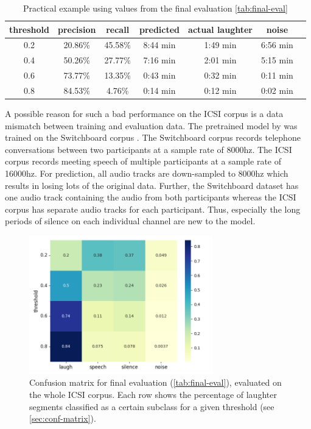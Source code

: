 \documentclass[bsc,frontabs,parskip,deptreport]{infthesis}
\newcommand{\confmatrixcaption}{Each row shows the percentage of laughter segments classified as a certain subclass for a given threshold (see \autoref{sec:conf-matrix}). }
\begin{document}
\begin{table}[]
    \centering
    \begin{tabular}{|c|c|c|c|c|c|c|}
      \hline
      threshold & precision & recall & predicted & actual laughter & noise \\
      \hline
      0.2 &  20.86\% & 45.58\% & 8:44 min & 1:49 min & 6:56 min \\
      0.4 &  50.26\% & 27.77\% & 7:16 min & 2:01 min & 5:15 min \\
      0.6 &  73.77\% & 13.35\% & 0:43 min & 0:32 min & 0:11 min \\
      0.8 &  84.53\% & 4.76\% & 0:14 min & 0:12 min & 0:02 min \\
      \hline
    \end{tabular}
    \caption{Practical example using values from the final evaluation \autoref{tab:final-eval}}
    \label{tab:practical-example}
\end{table}


A possible reason for such a bad performance on the ICSI corpus is a data mismatch between training and evaluation data. The pretrained model by \citet{gillick2021robust} was trained on the Switchboard corpus \citep{switchboard-corpus}. The Switchboard corpus records telephone conversations between two participants at a sample rate of 8000hz. The ICSI corpus records meeting speech of multiple participants at a sample rate of 16000hz. For prediction, all audio tracks are down-sampled to 8000hz which results in losing lots of the original data. 
Further, the Switchboard dataset has one audio track containing the audio from both participants whereas the ICSI corpus has separate audio tracks for each participant. Thus, especially the long periods of silence on each individual channel are new to the model. 

\begin{figure}[h!]
    \centering
    \includegraphics[width=8cm]{imgs/conf_matrix/init_eval_all.png}
    \caption{Confusion matrix for final evaluation (\autoref{tab:final-eval}), evaluated on the whole ICSI corpus. \confmatrixcaption}
    \label{fig:initial-conf-matrix}
\end{figure}
\end{document}
